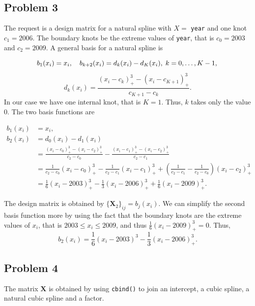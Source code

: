 \documentclass[
]{article}
\begin{document}
\hypertarget{problem-3}{%
\subsection{Problem 3}\label{problem-3}}

The request is a design matrix for a natural spline with \(X =\)
\texttt{year} and one knot \(c_1 = 2006\). The boundary knots be the
extreme values of \texttt{year}, that is \(c_0 = 2003\) and
\(c_2 = 2009\). A general basis for a natural spline is

\[
b_1(x_i) = x_i, \quad b_{k+2}(x_i) = d_k(x_i)-d_K(x_i),\; k = 0, \ldots, K - 1,\\
\] \[
d_k(x_i) = \frac{(x_i-c_k)^3_+-(x_i-c_{K+1})^3_+}{c_{K+1}-c_k}.
\] In our case we have one internal knot, that is \(K=1\). Thus, \(k\)
takes only the value 0. The two basis functions are

\begin{align*}
b_1(x_i) &= x_i,\\
b_2(x_i) &= d_0(x_i)-d_1(x_i)\\
&= \frac{(x_i-c_0)^3_+-(x_i-c_2)^3_+}{c_2-c_0} - \frac{(x_i-c_1)^3_+-(x_i-c_2)^3_+}{c_2-c_1}\\
&= \frac{1}{c_2-c_0}(x_i-c_0)^3_+ - \frac{1}{c_2-c_1}(x_i-c_1)^3_+ + \left(\frac{1}{c_2-c_1}-\frac{1}{c_2-c_0}\right)(x_i-c_{2})^3_+\\
&= \frac{1}{6}(x_i-2003)^3_+ - \frac{1}{3}(x_i-2006)^3_+ + \frac{1}{6}(x_i-2009)^3_+.
\end{align*}

The design matrix is obtained by \(\{\mathbf X_2\}_{ij} = b_j(x_i)\). We
can simplify the second basis function more by using the fact that the
boundary knots are the extreme values of \(x_i\), that is
\(2003 \leq x_i \leq 2009\), and thus \(\frac{1}{6}(x_i-2009)^3_+=0\).
Thus, \[
b_2(x_i) = \frac{1}{6}(x_i-2003)^3 - \frac{1}{3}(x_i-2006)^3_+.
\]

\hypertarget{problem-4}{%
\subsection{Problem 4}\label{problem-4}}

The matrix \(\mathbf X\) is obtained by using \texttt{cbind()} to join
an intercept, a cubic spline, a natural cubic spline and a factor.
\end{document}
